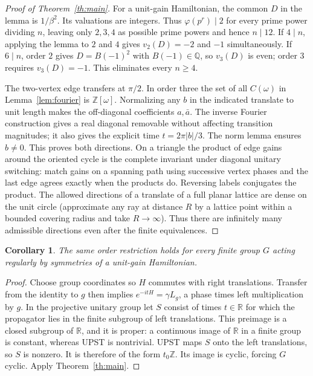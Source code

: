 \documentclass[10pt]{article}
\newtheorem{corollary}[theorem]{Corollary}
\newcommand{\ZZ}{\mathbb Z}\newcommand{\QQ}{\mathbb Q}
\begin{document}
\begin{proof}[Proof of Theorem~\ref{th:main}]
For a unit-gain Hamiltonian, the common $D$ in the lemma is $1/\beta^2$.
Its valuations are integers. Thus $\varphi(p^r)\mid2$ for every prime
power dividing $n$, leaving only $2,3,4$ as possible prime powers and hence $n\mid 12$.
If $4\mid n$, applying the lemma to $2$ and $4$ gives $v_2(D)=-2$ and
$-1$ simultaneously.
If $6\mid n$, order $2$ gives $D=B(-1)^2$ with $B(-1)\in\QQ$, so $v_3(D)$ is even; order $3$ requires $v_3(D)=-1$.
This eliminates every $n\ge4$.

The two-vertex edge transfers at $\pi/2$.
In order three the set of all $C(\omega)$ in Lemma~\ref{lem:fourier}
is $\ZZ[\omega]$. Normalizing any $b$ in the indicated translate to unit
length makes the off-diagonal coefficients $a,\bar a$. The inverse Fourier construction gives a real diagonal removable without affecting transition magnitudes; it also gives the explicit time $t=2\pi|b|/3$.
The norm lemma ensures $b\ne0$. This proves both directions.
On a triangle the product of edge gains around the oriented cycle is the complete invariant under diagonal unitary switching: match gains on a spanning path using successive vertex phases and the last edge agrees exactly when the products do. Reversing labels conjugates the product. The allowed directions of a translate of a full planar lattice are dense on the unit circle (approximate any ray at distance $R$ by a lattice point within a bounded covering radius and take $R\to\infty$). Thus there are infinitely many admissible directions even after the finite equivalences.
\end{proof}

\begin{corollary}
The same order restriction holds for every finite group $G$ acting regularly
by symmetries of a unit-gain Hamiltonian.
\end{corollary}
\begin{proof}
Choose group coordinates so $H$ commutes with right translations. Transfer
from the identity to $g$ then implies $e^{-itH}=\gamma L_g$, a phase times left multiplication by $g$. In the projective unitary group let $S$ consist of times $t\in\mathbb R$ for which the propagator lies in the finite subgroup of left translations.
This preimage is a closed subgroup of $\mathbb R$, and it is proper:
a continuous image of $\mathbb R$ in a finite group is constant, whereas UPST is nontrivial.
UPST maps $S$ onto the left translations, so $S$ is nonzero. It is therefore of the form $t_0\ZZ$.
Its image is cyclic, forcing $G$ cyclic. Apply Theorem~\ref{th:main}.
\end{proof}
\end{document}
